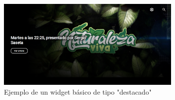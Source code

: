 \begin{figure}[hp!]
    \centering
    \includegraphics[width=0.8\textwidth]{imaxes/Widget_destacado.png}
    \caption{Ejemplo de un widget básico de tipo "destacado"}
    \label{fig:Widget_mosaico}
\end{figure}

